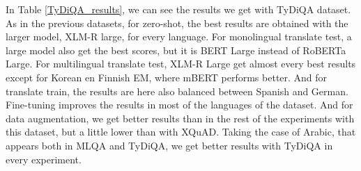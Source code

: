 \documentclass[11pt]{article}
\begin{document}
In Table \ref{TyDiQA_results}, we can see the results we get with TyDiQA dataset. As in the previous datasets, for zero-shot, the best results are obtained with the larger model, XLM-R large, for every language. For monolingual translate test, a large model also get the best scores, but it is BERT Large instead of RoBERTa Large. For multilingual translate test, XLM-R Large get almost every best results except for Korean en Finnish EM, where mBERT performs better. And for translate train, the results are here also balanced between Spanish and German.  Fine-tuning improves the results in most of the languages of the dataset. And for data augmentation, we get better results than in the rest of the experiments with this dataset, but a little lower than with XQuAD. Taking the case of Arabic, that appears both in MLQA and TyDiQA, we get better results with TyDiQA in every experiment.
\end{document}
